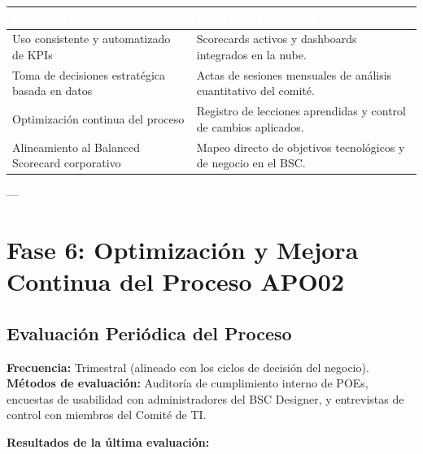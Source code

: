 \documentclass[11pt]{article}
\newcounter{none} %
\begin{document}
\vspace{0.3cm}
\setlength{\tabcolsep}{6pt}
\renewcommand{\arraystretch}{1.5}
{\def\LTcaptype{none}
\begin{longtable}[]{@{}
  >{\raggedright\arraybackslash}p{0.45\linewidth}
  >{\raggedright\arraybackslash}p{0.55\linewidth}@{}}
\rowcolor{DeepNavy}
\textcolor{white}{\textbf{Requisito de Madurez Nivel 5}} & \textcolor{white}{\textbf{Evidencia Disponible}} \\ \hline
\endhead
\rowcolor{LightGray}
Uso consistente y automatizado de KPIs & Scorecards activos y dashboards integrados en la nube. \\ \hline
Toma de decisiones estratégica basada en datos & Actas de sesiones mensuales de análisis cuantitativo del comité. \\ \hline
\rowcolor{LightGray}
Optimización continua del proceso & Registro de lecciones aprendidas y control de cambios aplicados. \\ \hline
Alineamiento al Balanced Scorecard corporativo & Mapeo directo de objetivos tecnológicos y de negocio en el BSC. \\ \hline
\end{longtable}
}

---

\section{Fase 6: Optimización y Mejora Continua del Proceso APO02}

\subsection{Evaluación Periódica del Proceso}
\textbf{Frecuencia:} Trimestral (alineado con los ciclos de decisión del negocio).
\textbf{Métodos de evaluación:} Auditoría de cumplimiento interno de POEs, encuestas de usabilidad con administradores del BSC Designer, y entrevistas de control con miembros del Comité de TI.

\textbf{Resultados de la última evaluación:}
\end{document}
